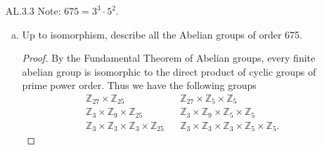 \documentclass[12pt]{article}
\begin{document}
\begin{enumerate}
\begin{proof}
\begin{equation*}
                    |f_n(x_i)-f(x_i)|<\frac{\varepsilon}{4}. 
                \end{equation*}
                Let $N=\max\{N_1, \dots, N_n\}$ and take $n, m\geq N$. For each
                $x\in K$, there exists $x_i\in K$ such that $x\in
                N_{\delta}(x_i)$ and 
                \begin{align*}
                    |f_n(x)-f_m(x)|&=|f_n(x)-f_n(x_i)+f_n(x_i)-f(x_i)
                    +f(x_i)-f_m(x_i)+f_m(x_i)-f_m(x)| \\
                    &\leq|f_n(x)-f_n(x_i)|+|f_n(x_i)-f(x_i)|+|f(x_i)-f_m(x_i)|
                    +|f_m(x_i)-f_m(x)| \\
                    &<\frac{\varepsilon}{4}+\frac{\varepsilon}{4}+
                    \frac{\varepsilon}{4}+\frac{\varepsilon}{4}=\varepsilon. 
                \end{align*}
                Therefore $\{f_n\}$ is uniformly convergent over $K$. 
            \end{proof}
        \item[AL.3.3] Note: $675=3^3\cdot 5^2$.
            \begin{enumerate}[(a)]
                \item Up to isomorphism, describe all the Abelian groups of
                    order 675.
                    \begin{proof}
                        By the Fundamental Theorem of Abelian groups, every
                        finite abelian group is isomorphic to the direct
                        product of cyclic groups of prime power order. Thus we
                        have the following groups 
                        \begin{align*}
                            \mathbb{Z}_{27}\times\mathbb{Z}_{25}
                            & &\mathbb{Z}_{27}\times\mathbb{Z}_{5}\times\mathbb{Z}_5
                            \\
                            \mathbb{Z}_{3}\times\mathbb{Z}_9\times\mathbb{Z}_{25}
                            & &\mathbb{Z}_{3}\times\mathbb{Z}_{9}\times\mathbb{Z}_{5}
                            \times\mathbb{Z}_{5} \\
                            \mathbb{Z}_{3}\times\mathbb{Z}_{3}\times\mathbb{Z}_{3}
                            \times\mathbb{Z}_{25}
                            & &\mathbb{Z}_{3}\times\mathbb{Z}_{3}\times\mathbb{Z}_{3}
                            \times\mathbb{Z}_{5}\times\mathbb{Z}_{5}. 
                        \end{align*}

\end{proof}
\end{enumerate}
\end{enumerate}
\end{document}
